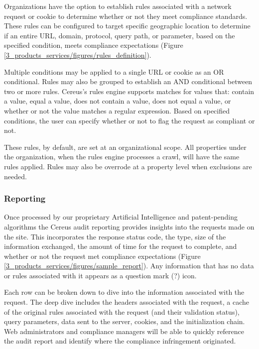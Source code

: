 Organizations have the option to establish rules associated with a network request or cookie to determine whether or not they meet compliance standards. These rules can be configured to target specific geographic location to determine if an entire URL, domain, protocol, query path, or parameter, based on the specified condition, meets compliance expectations (Figure \ref{3_products_services/figures/rules_definition}).

Multiple conditions may be applied to a single URL or cookie as an OR conditional. Rules may also be grouped to establish an AND conditional between two or more rules. Cereus's rules engine supports matches for values that: contain a value, equal a value, does not contain a value, does not equal a value, or whether or not the value matches a regular expression. Based on specified conditions, the user can specify whether or not to flag the request as compliant or not.


These rules, by default, are set at an organizational scope. All properties under the organization, when the rules engine processes a crawl, will have the same rules applied. Rules may also be overrode at a property level when exclusions are needed.

\subsubsection{Reporting}

Once processed by our proprietary Artificial Intelligence and patent-pending algorithms the Cereus audit reporting provides insights into the requests made on the site. This incorporates the response status code, the type, size of the information exchanged, the amount of time for the request to complete, and whether or not the request met compliance expectations (Figure \ref{3_products_services/figures/sample_report}). Any information that has no data or rules associated with it appears as a question mark (?) icon.

Each row can be broken down to dive into the information associated with the request. The deep dive includes the headers associated with the request, a cache of the original rules associated with the request (and their validation status), query parameters, data sent to the server, cookies, and the initialization chain. Web administrators and compliance managers will be able to quickly reference the audit report and identify where the compliance infringement originated.

